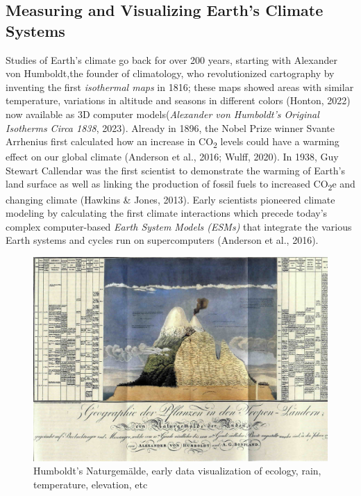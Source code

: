 \documentclass[
  12pt,
  letterpaper,
  DIV=11,
  numbers=noendperiod]{scrartcl}
\begin{document}
\subsection{Measuring and Visualizing Earth's Climate
Systems}\label{measuring-and-visualizing-earths-climate-systems}

Studies of Earth's climate go back for over 200 years, starting with
Alexander von Humboldt,the founder of climatology, who revolutionized
cartography by inventing the first \emph{isothermal maps} in 1816; these
maps showed areas with similar temperature, variations in altitude and
seasons in different colors (Honton, 2022) now available as 3D computer
models(\emph{Alexander von {Humboldt}'s Original Isotherms Circa 1838},
2023). Already in 1896, the Nobel Prize winner Svante Arrhenius first
calculated how an increase in CO\textsubscript{2} levels could have a
warming effect on our global climate (Anderson et al., 2016; Wulff,
2020). In 1938, Guy Stewart Callendar was the first scientist to
demonstrate the warming of Earth's land surface as well as linking the
production of fossil fuels to increased CO\textsubscript{2}e and
changing climate (Hawkins \& Jones, 2013). Early scientists pioneered
climate modeling by calculating the first climate interactions which
precede today's complex computer-based \emph{Earth System Models (ESMs)}
that integrate the various Earth systems and cycles run on
supercomputers (Anderson et al., 2016).

\begin{figure}[H]

{\centering \includegraphics[width=1\linewidth,height=\textheight,keepaspectratio]{./images/sustainability/humboldt.jpg}

}

\caption{Humboldt's Naturgemälde, early data visualization of ecology,
rain, temperature, elevation, etc}

\end{figure}%
\end{document}

